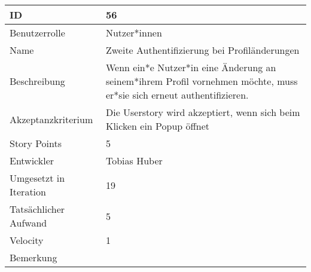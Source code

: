 \begin{tabularx}{\textwidth}{|p{}|X|}
	\hline
	ID & 56\\
	\hline
	Benutzerrolle & Nutzer*innen\\
	\hline
	Name & Zweite Authentifizierung bei Profiländerungen\\
	\hline
	Beschreibung & Wenn ein*e Nutzer*in eine Änderung an seinem*ihrem Profil vornehmen möchte, muss er*sie sich erneut authentifizieren.\\
	\hline
	Akzeptanzkriterium & Die Userstory wird akzeptiert, wenn sich beim Klicken ein Popup öffnet \\
	\hline
	Story Points & 5\\
	\hline
	Entwickler & Tobias Huber\\
	\hline
	Umgesetzt in Iteration & 19\\ 
	\hline
	Tatsächlicher Aufwand & 5\\
	\hline
	Velocity & 1\\
	\hline
	Bemerkung & \\
	\hline
\end{tabularx}
\vspace{20pt}
